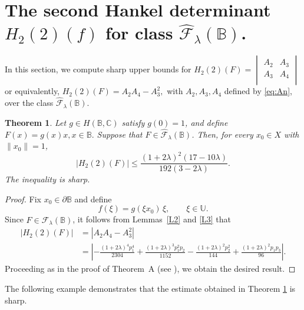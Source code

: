 \documentclass[11pt, reqno]{amsart}
\newtheorem{theo}{Theorem}[section]
\numberwithin{equation}{section}
\begin{document}
\section{{\bf The second Hankel determinant $H_2(2)(f)$ for class $\widehat{\mathcal{F}}_{\lambda}(\mathbb{B})$.}}
In this section, we compute sharp upper bounds for 
$H_{2}(2)(F)=
\begin{vmatrix}
A_{2} & A_{3} \\
A_{3} & A_{4} \\
\end{vmatrix}$
or equivalently, $H_{2}(2)(F)
=A_2A_4-A_3^2,$
with  $A_{2},A_{3},A_{4}$ defined by
\eqref{eq:An},
over the class $\widehat{\mathcal{F}}_{\lambda}(\mathbb{B})$.

\begin{theo}\label{H1}
Let $g\in H(\mathbb{B},\mathbb{C})$ satisfy $g(0)=1$, and define $F(x)=g(x)x, x\in\mathbb{B}.$
Suppose that $F\in\widehat{\mathcal{F}}_{\lambda}(\mathbb{B})$. Then, for every
$x_{0}\in X$ with $\|x_{0}\|=1$,
\[
|H_{2}(2)(F)|\leq  \frac{(1+2\lambda)^2(17-10\lambda)}{192(3-2\lambda)}.
\]
 The inequality is sharp.
\end{theo}
\begin{proof} Fix \(x_{0}\in\partial\mathbb{B}\) and define
\[
f(\xi)=g(\xi x_{0})\,\xi,\qquad \xi\in\mathbb{U}.
\]
Since \(F\in\widehat{\mathcal{F}}_{\lambda}(\mathbb{B})\), it follows from Lemmas~\ref{L2} and \ref{L3} that
\begin{align*}
|H_{2}(2)(F)|
&=|A_2A_4-A_3^2|\\
&=
\left|
-\frac{(1+2\lambda)^4p_1^4}{2304}
+\frac{(1+2\lambda)^3p_1^2p_2}{1152}
-\frac{(1+2\lambda)^2p_2^2}{144}
+\frac{(1+2\lambda)^2p_1p_3}{96}
\right|.
\end{align*}
Proceeding as in the proof of Theorem~A (see \cite[Theorem~3.1]{ALT2022}), we obtain the desired result.
\end{proof}

The following example demonstrates that the estimate obtained in Theorem \ref{H1} is sharp.
\end{document}
